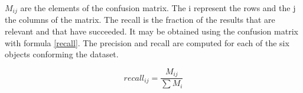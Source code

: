 		$M_{ij}$ are the elements of the confusion matrix. 
		The i represent the rows and the j the columns of the matrix. 
		The recall is the fraction of the results that are relevant and that have succeeded. 
		It may be obtained using the confusion matrix with formula \ref{recall}.
		The precision and recall are computed for each of the six objects conforming the dataset. 

		\begin{center}
		\begin{equation}
		\label{recall}
		recall_{ij}=\frac{M_{ij}}{\sum M_i}
		\end{equation}
		\end{center}










